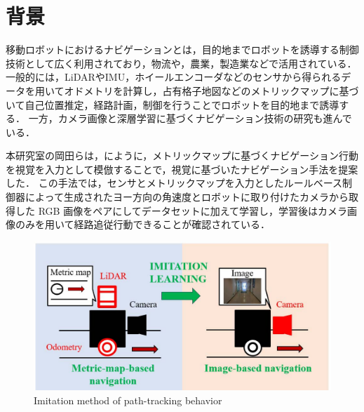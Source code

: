 
\section{背景}
移動ロボットにおけるナビゲーションとは，目的地までロボットを誘導する制御技術として広く利用されており，物流や，農業，製造業などで活用されている．
一般的には，LiDARやIMU，ホイールエンコーダなどのセンサから得られるデータを用いてオドメトリを計算し，占有格子地図などのメトリックマップに基づいて自己位置推定，経路計画，制御を行うことでロボットを目的地まで誘導する．
一方，カメラ画像と深層学習に基づくナビゲーション技術の研究も進んでいる．

本研究室の岡田らは，にように，メトリックマップに基づくナビゲーション行動を視覚を入力として模倣することで，視覚に基づいたナビゲーション手法を提案した．
この手法では，センサとメトリックマップを入力としたルールベース制御器によって生成されたヨー方向の角速度とロボットに取り付けたカメラから取得した RGB 画像をペアにしてデータセットに加えて学習し，学習後はカメラ画像のみを用いて経路追従行動できることが確認されている．
\begin{figure}[htbp]
     \centering
     \includegraphics[width=130mm]{images/pdf/ishiguro/system.pdf}
     \caption{Imitation method of path-tracking behavior}
     \label{fig:imitation_sys}
\end{figure}

